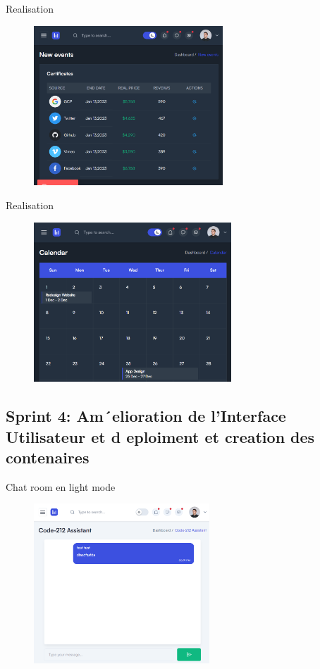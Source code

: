 \begin{frame}{Realisation}
    \begin{figure}[H]
        \centering
        \includegraphics[height=6cm]{assets/images/certifs-list.png}
    \end{figure}
\end{frame}

\begin{frame}{Realisation}
    \begin{figure}[H]
        \centering
        \includegraphics[height=6cm]{assets/images/calendar.png}
    \end{figure}
\end{frame}


\subsection{Sprint 4: Am´elioration de l’Interface Utilisateur et d eploiment et creation des
    contenaires}

\begin{frame}{Chat room en light mode}
    \begin{figure}[H]
        \centering
        \includegraphics[height=6cm]{assets/images/light-chat.png}
    \end{figure}
\end{frame}

